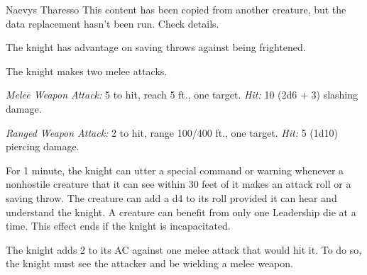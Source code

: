 \documentclass[10pt,a4paper,twoside,bg=print,twocolumn,openany,nodeprecatedcode]{dndbook}
\begin{document}
\begin{DndMonster}[float=t]{Naevys Tharesso}
\DndMonsterBasics[
armor-class = {18 (\textit{plate armor})},
hit-points = {\DndDice{8d8 + 16}},
speed = {30 ft.}
]
\DndMonsterAbilityScores[
 str = 16,
 dex = 11,
 con = 14,
 int = 11,
 wis = 11,
 cha = 15
]
\DndMonsterDetails[
saving-throws = {Con +4, Wis +2},
languages = {any one language (usually Common)},
challenge = 3,
]
This content has been copied from another creature, but the data replacement hasn't been run. Check details.

The knight has advantage on saving throws against being frightened.

The knight makes two melee attacks.

\textsl{Melee Weapon Attack:} 5 to hit, reach 5 ft., one target. \textsl{Hit:} 10 (2d6 + 3) slashing damage.

\textsl{Ranged Weapon Attack:} 2 to hit, range 100/400 ft., one target. \textsl{Hit:} 5 (1d10) piercing damage.

For 1 minute, the knight can utter a special command or warning whenever a nonhostile creature that it can see within 30 feet of it makes an attack roll or a saving throw. The creature can add a d4 to its roll provided it can hear and understand the knight. A creature can benefit from only one Leadership die at a time. This effect ends if the knight is incapacitated.

The knight adds 2 to its AC against one melee attack that would hit it. To do so, the knight must see the attacker and be wielding a melee weapon.

\end{DndMonster}
\end{document}
